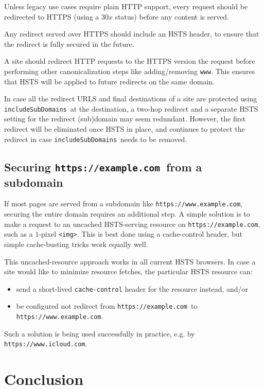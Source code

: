 \documentclass[conference]{./IEEEtran}
\newcommand{\site}[1]{\texttt{#1}}
\newcommand{\code}[1]{\texttt{#1}}
\newcommand{\iSD}{{\code{includeSubDomains}}}
\newcommand{\genericsite}{example.com}
\newcommand{\s}{{\site{https://\genericsite}}}
\newcommand{\sw}{{\site{https://www.\genericsite}}}
\theoremstyle{plain}
\begin{document}
Unless legacy use cases require plain HTTP support, every request should be redirected to HTTPS (using a $30x$ status) before any content is served.

Any redirect served over HTTPS should include an HSTS header, to ensure that the redirect is fully secured in the future.

A site should redirect HTTP requests to the HTTPS version the request before performing other canonicalization steps like adding/removing \code{www}. This ensures that HSTS will be applied to future redirects on the same domain.

In case all the redirect URLS and final destinations of a site are protected using \iSD~at the destination, a two-hop redirect and a separate HSTS setting for the redirect (sub)domain may seem redundant. However, the first redirect will be eliminated once HSTS in place, and continues to protect the redirect in case \iSD~needs to be removed.

\subsection{Securing \s~from a subdomain}

If most pages are served from a subdomain like \sw, securing the entire domain requires an additional step. A simple solution is to make a request to an uncached HSTS-serving resource on \s, such as a $1$-pixel \code{<img>}. This is best done using a cache-control header, but simple cache-busting tricks work equally well.

This uncached-resource approach works in all current HSTS browsers. In case a site would like to minimize resource fetches, the particular HSTS resource can:
\begin{itemize}
\item send a short-lived \code{cache-control} header for the resource instead, and/or
\item be configured not redirect from \s~to \sw.
\end{itemize}

Such a solution is being used successfully in practice, e.g. by \site{https://www.icloud.com}.

\section{Conclusion}



\end{document}
